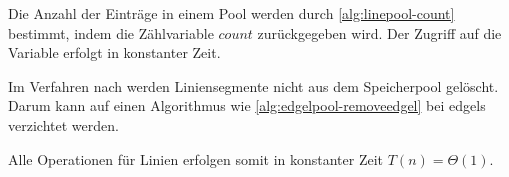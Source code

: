 

Die Anzahl der Einträge in einem Pool werden durch \autoref{alg:linepool-count} bestimmt, indem die Zählvariable
 $\mathit{count}$ zurückgegeben wird. Der Zugriff auf die Variable erfolgt in konstanter Zeit.



Im Verfahren nach \citeauthor{clarke96} werden Liniensegmente nicht aus dem Speicherpool gelöscht. Darum kann auf
 einen Algorithmus wie \autoref{alg:edgelpool-removeedgel} bei \glspl{edgel} verzichtet werden.

Alle Operationen für Linien erfolgen somit in konstanter Zeit $T(n) = \Theta(1)$.

